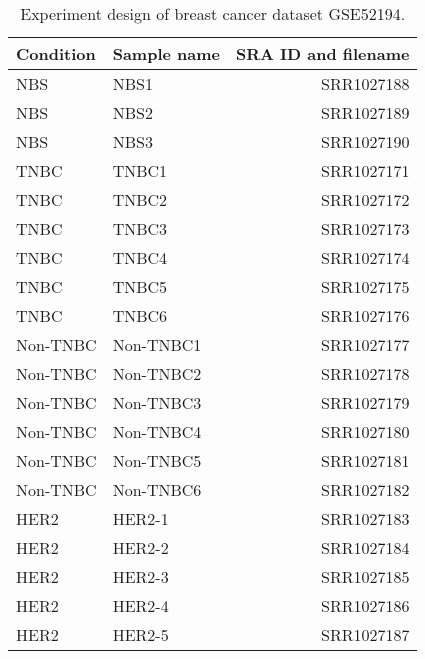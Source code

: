 \begin{table}[!htbp]
    \caption[Experiment design of GSE52194]{
        Experiment design of breast cancer dataset GSE52194.
    }
    \label{tab:gse52194}
    \centering
    \begin{threeparttable}
        \begin{tabular}{llr}
            \toprule
            Condition & Sample name & SRA ID and filename \\
            \midrule
            NBS      & NBS1      & SRR1027188 \\
            NBS      & NBS2      & SRR1027189 \\
            NBS      & NBS3      & SRR1027190 \\
            TNBC     & TNBC1     & SRR1027171 \\
            TNBC     & TNBC2     & SRR1027172 \\
            TNBC     & TNBC3     & SRR1027173 \\
            TNBC     & TNBC4     & SRR1027174 \\
            TNBC     & TNBC5     & SRR1027175 \\
            TNBC     & TNBC6     & SRR1027176 \\
            Non-TNBC & Non-TNBC1 & SRR1027177 \\
            Non-TNBC & Non-TNBC2 & SRR1027178 \\
            Non-TNBC & Non-TNBC3 & SRR1027179 \\
            Non-TNBC & Non-TNBC4 & SRR1027180 \\
            Non-TNBC & Non-TNBC5 & SRR1027181 \\
            Non-TNBC & Non-TNBC6 & SRR1027182 \\
            HER2     & HER2-1    & SRR1027183 \\
            HER2     & HER2-2    & SRR1027184 \\
            HER2     & HER2-3    & SRR1027185 \\
            HER2     & HER2-4    & SRR1027186 \\
            HER2     & HER2-5    & SRR1027187 \\
            \bottomrule
        \end{tabular}
    \end{threeparttable}
\end{table}
